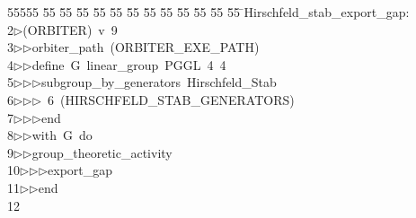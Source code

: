 %
%
\begin{tabbing}
55555 \= 55 \= 55 \= 55 \= 55 \= 55 \= 55 \= 55 \= 55 \= 55 \= 55 \= 55 \= 55 \= \>Hirschfeld\_stab\_export\_gap:\\[0pt]
2\>$\triangleright$\>(ORBITER)\ v\ 9\ \\[0pt]
3\>$\triangleright$\>$\triangleright$\>orbiter\_path\ (ORBITER\_EXE\_PATH)\ \\[0pt]
4\>$\triangleright$\>$\triangleright$\>define\ G\ linear\_group\ PGGL\ 4\ 4\ \\[0pt]
5\>$\triangleright$\>$\triangleright$\>$\triangleright$\>subgroup\_by\_generators\ Hirschfeld\_Stab\ \\[0pt]
6\>$\triangleright$\>$\triangleright$\>$\triangleright$\ 6\ (HIRSCHFELD\_STAB\_GENERATORS)\ \\[0pt]
7\>$\triangleright$\>$\triangleright$\>$\triangleright$\>end\ \\[0pt]
8\>$\triangleright$\>$\triangleright$\>with\ G\ do\ \\[0pt]
9\>$\triangleright$\>$\triangleright$\>group\_theoretic\_activity\ \\[0pt]
10\>$\triangleright$\>$\triangleright$\>$\triangleright$\>export\_gap\ \\[0pt]
11\>$\triangleright$\>$\triangleright$\>end\\[0pt]
12\>\end{tabbing}
